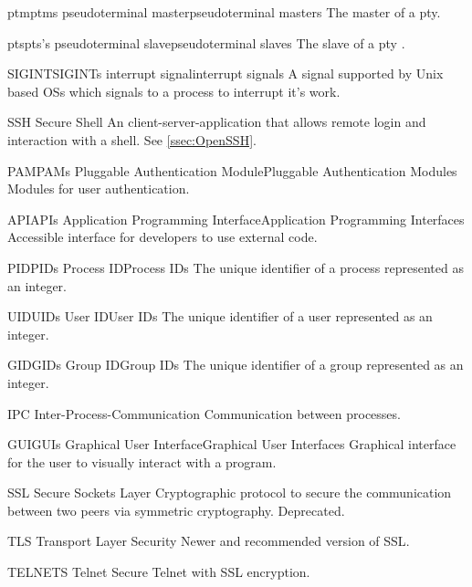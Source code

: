 %
{ptm}{ptms}%
{pseudoterminal master}{pseudoterminal masters}%
{The master of a \gls{pty}.}

%
{pts}{pts's}%
{pseudoterminal slave}{pseudoterminal slaves}%
{The slave of a \gls{pty} \citep{pts}.}

%
{SIGINT}{SIGINTs}%
{interrupt signal}{interrupt signals}%
{A signal supported by \gls{Unix} based \glspl{OS} which signals to a process to interrupt it's work.}

%
{SSH}{}%
{Secure Shell}{}%
{An client-server-application that allows remote login and interaction with a \gls{shell}. See \ref{ssec:OpenSSH}.}

%
{PAM}{PAMs}%
{Pluggable Authentication Module}{Pluggable Authentication Modules}%
{Modules for user authentication.}

%
{API}{APIs}%
{Application Programming Interface}{Application Programming Interfaces}%
{Accessible interface for developers to use external code.}

%
{PID}{PIDs}%
{Process ID}{Process IDs}%
{The unique identifier of a process represented as an integer.}

%
{UID}{UIDs}%
{User ID}{User IDs}%
{The unique identifier of a user represented as an integer.}

%
{GID}{GIDs}%
{Group ID}{Group IDs}%
{The unique identifier of a group represented as an integer.}

%
{IPC}{}%
{Inter-Process-Communication}{}%
{Communication between processes.}

%
{GUI}{GUIs}%
{Graphical User Interface}{Graphical User Interfaces}%
{Graphical interface for the user to visually interact with a program.}

%
{SSL}{}%
{Secure Sockets Layer}{}%
{Cryptographic protocol to secure the communication between two peers via symmetric cryptography. Deprecated.}

%
{TLS}{}%
{Transport Layer Security}{}%
{Newer and recommended version of \gls{SSL}.}

%
{TELNETS}{}%
{Telnet Secure}{}%
{Telnet with \gls{SSL} encryption.}


